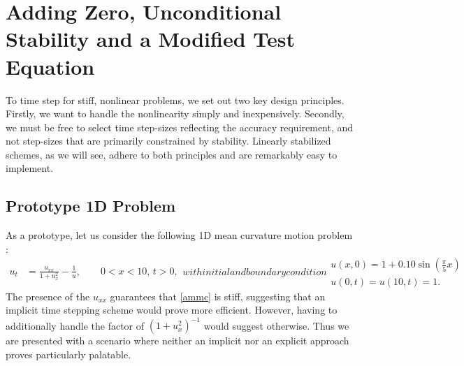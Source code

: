 \chapter{Adding Zero, Unconditional Stability and a Modified Test Equation}
To time step for stiff, nonlinear problems, we set out two key design principles. Firstly, we want to handle the nonlinearity simply and inexpensively. Secondly, we must be free to select time step-sizes reflecting the accuracy requirement, and not step-sizes that are primarily constrained by stability. Linearly stabilized schemes, as we will see, adhere to both principles and are remarkably easy to implement.

\section{Prototype 1D Problem}
As a prototype, let us consider the following 1D mean curvature motion problem \cite{duchemin2014explicit}: 
\begin{subequations} 
\begin{align}
u_t &= \frac{u_{xx}}{1 + u_x^2} - \frac{1}{u}, 
\qquad 0 < x < 10, \, t > 0,
\end{align}
with initial and boundary condition
\begin{gather}
u(x,0) = 1 + 0.10\sin\left( \frac{\pi}{5}x \right) 
\\
u(0,t)=u(10,t)=1.
\end{gather}
\label{ammc}
\end{subequations}
The presence of the $u_{xx}$ guarantees that \eqref{ammc} is stiff, suggesting that an implicit time stepping scheme would prove more efficient. However, having to additionally handle the factor of $(1+u_x^2)^{-1}$ would suggest otherwise. Thus we are presented with a scenario where neither an implicit nor an explicit approach proves particularly palatable.

